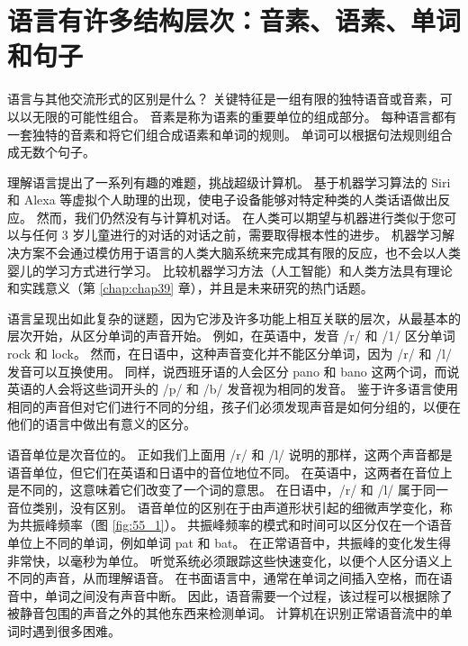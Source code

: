 \section{语言有许多结构层次：音素、语素、单词和句子}

语言与其他交流形式的区别是什么？
关键特征是一组有限的独特语音或音素，可以以无限的可能性组合。
音素是称为语素的重要单位的组成部分。
每种语言都有一套独特的音素和将它们组合成语素和单词的规则。
单词可以根据句法规则组合成无数个句子。


理解语言提出了一系列有趣的难题，挑战超级计算机。 基于机器学习算法的 Siri 和 Alexa 等虚拟个人助理的出现，使电子设备能够对特定种类的人类话语做出反应。 然而，我们仍然没有与计算机对话。 在人类可以期望与机器进行类似于您可以与任何 3 岁儿童进行的对话的对话之前，需要取得根本性的进步。 机器学习解决方案不会通过模仿用于语言的人类大脑系统来完成其有限的反应，也不会以人类婴儿的学习方式进行学习。 比较机器学习方法（人工智能）和人类方法具有理论和实践意义（第 \ref{chap:chap39} 章），并且是未来研究的热门话题。

语言呈现出如此复杂的谜题，因为它涉及许多功能上相互关联的层次，从最基本的层次开始，从区分单词的声音开始。 例如，在英语中，发音 /r/ 和 /1/ 区分单词 rock 和 lock。 然而，在日语中，这种声音变化并不能区分单词，因为 /r/ 和 /l/ 发音可以互换使用。 同样，说西班牙语的人会区分 pano 和 bano 这两个词，而说英语的人会将这些词开头的 /p/ 和 /b/ 发音视为相同的发音。 鉴于许多语言使用相同的声音但对它们进行不同的分组，孩子们必须发现声音是如何分组的，以便在他们的语言中做出有意义的区分。

语音单位是次音位的。 正如我们上面用 /r/ 和 /l/ 说明的那样，这两个声音都是语音单位，但它们在英语和日语中的音位地位不同。 在英语中，这两者在音位上是不同的，这意味着它们改变了一个词的意思。 在日语中，/r/ 和 /l/ 属于同一音位类别，没有区别。 语音单位的区别在于由声道形状引起的细微声学变化，称为共振峰频率（图 \ref{fig:55_1}）。 共振峰频率的模式和时间可以区分仅在一个语音单位上不同的单词，例如单词 pat 和 bat。 在正常语音中，共振峰的变化发生得非常快，以毫秒为单位。 听觉系统必须跟踪这些快速变化，以便个人区分语义上不同的声音，从而理解语音。 在书面语言中，通常在单词之间插入空格，而在语音中，单词之间没有声音中断。 因此，语音需要一个过程，该过程可以根据除了被静音包围的声音之外的其他东西来检测单词。 计算机在识别正常语音流中的单词时遇到很多困难。

